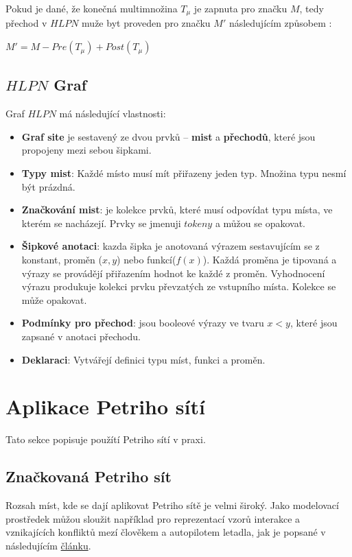 Pokud je dané, že konečná multimnožina $T_\mu$ je zapnuta pro značku $M$, tedy přechod v $HLPN$ muže byt proveden pro značku $M'$ následujícím způsobem \cite[p.~12]{pnstd54}:
\begin{center}
  $M' = M - Pre(T_\mu) + Post(T_\mu)$
\end{center}


\subsection{$HLPN$ Graf}
\label{subsec:hlpn-graph}

Graf $HLPN$ má následující vlastnosti:
\begin{itemize}
  \item \textbf{Graf site} je sestavený ze dvou prvků -- \textbf{mist} a \textbf{přechodů}, které jsou propojeny mezi sebou šipkami.
  \item \textbf{Typy mist}: Každé místo musí mít přiřazeny jeden typ. Množina typu nesmí být prázdná.
  \item \textbf{Značkování mist}: je kolekce prvků, které musí odpovídat typu místa, ve kterém se nacházejí. Prvky se jmenuji $tokeny$ a můžou se opakovat.
  \item \textbf{Šipkové anotaci}: kazda šipka je anotovaná výrazem  sestavujícím se z konstant, proměn ($x, y$) nebo funkcí($f(x)$). Každá proměna je tipovaná a výrazy se provádějí přiřazením hodnot ke každé z proměn. Vyhodnocení výrazu produkuje kolekci prvku převzatých ze vstupního místa. Kolekce se může opakovat.
  \item \textbf{Podmínky pro přechod}: jsou booleové výrazy ve tvaru $x < y$, které jsou zapsané v anotaci přechodu.
  \item \textbf{Deklaraci}: Vytvářejí definici typu míst, funkci a proměn.
\end{itemize}

\section{Aplikace Petriho sítí}
\label{sec:pn-application}
Tato sekce popisuje použítí Petriho sítí v praxi.

\subsection{Značkovaná Petriho sít}
Rozsah míst, kde se dají aplikovat Petriho sítě je velmi široký. Jako modelovací prostředek můžou sloužit například pro reprezentací vzorů interakce a vznikajících konfliktů mezí člověkem a autopilotem letadla, jak je popsané v následujícím \href{https://www-tandfonline-com.ezproxy.lib.vutbr.cz/doi/full/10.1080/00140139.2013.877597}{článku}.


